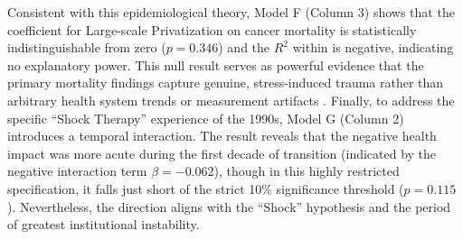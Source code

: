\documentclass[en,magisterska]{pracamgr}
\begin{document}
Consistent with this epidemiological theory, Model F (Column 3) shows that the coefficient for Large-scale Privatization on cancer mortality is statistically indistinguishable from zero ($p = 0.346$) and 
the $R^2$ within is negative, indicating no explanatory power. This null result serves as powerful evidence that the primary mortality findings capture genuine, stress-induced trauma rather than arbitrary 
health system trends or measurement artifacts \citep{Azarova2018, Leon1997}. Finally, to address the specific ``Shock Therapy'' experience of the 1990s, Model G (Column 2) introduces a temporal interaction. 
The result reveals that the negative health impact was more acute during the first decade of transition (indicated by the negative interaction term $\beta = -0.062$), though in this highly restricted 
specification, it falls just short of the strict 10\% significance threshold ($p = 0.115$). Nevertheless, the direction aligns with the ``Shock'' hypothesis and the period of greatest institutional instability.
\end{document}
